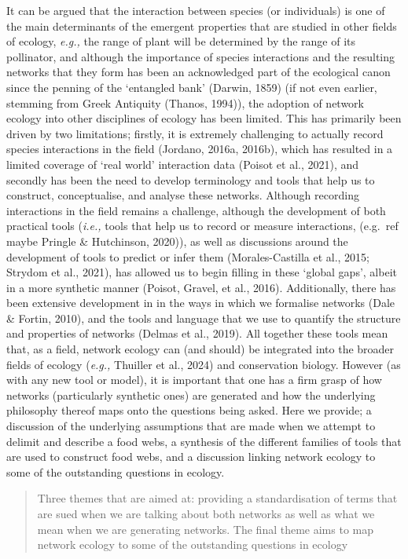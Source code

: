\documentclass[
]{article}
\begin{document}
It can be argued that the interaction between species (or individuals)
is one of the main determinants of the emergent properties that are
studied in other fields of ecology, \emph{e.g.,} the range of plant will
be determined by the range of its pollinator, and although the
importance of species interactions and the resulting networks that they
form has been an acknowledged part of the ecological canon since the
penning of the `entangled bank' (Darwin, 1859) (if not even earlier,
stemming from Greek Antiquity (Thanos, 1994)), the adoption of network
ecology into other disciplines of ecology has been limited. This has
primarily been driven by two limitations; firstly, it is extremely
challenging to actually record species interactions in the field
(Jordano, 2016a, 2016b), which has resulted in a limited coverage of
`real world' interaction data (Poisot et al., 2021), and secondly has
been the need to develop terminology and tools that help us to
construct, conceptualise, and analyse these networks. Although recording
interactions in the field remains a challenge, although the development
of both practical tools (\emph{i.e.,} tools that help us to record or
measure interactions, (e.g.~ref maybe Pringle \& Hutchinson, 2020)), as
well as discussions around the development of tools to predict or infer
them (Morales-Castilla et al., 2015; Strydom et al., 2021), has allowed
us to begin filling in these `global gaps', albeit in a more synthetic
manner (Poisot, Gravel, et al., 2016). Additionally, there has been
extensive development in in the ways in which we formalise networks
(Dale \& Fortin, 2010), and the tools and language that we use to
quantify the structure and properties of networks (Delmas et al., 2019).
All together these tools mean that, as a field, network ecology can (and
should) be integrated into the broader fields of ecology (\emph{e.g.,}
Thuiller et al., 2024) and conservation biology. However (as with any
new tool or model), it is important that one has a firm grasp of how
networks (particularly synthetic ones) are generated and how the
underlying philosophy thereof maps onto the questions being asked. Here
we provide; a discussion of the underlying assumptions that are made
when we attempt to delimit and describe a food webs, a synthesis of the
different families of tools that are used to construct food webs, and a
discussion linking network ecology to some of the outstanding questions
in ecology.

\begin{quote}
Three themes that are aimed at: providing a standardisation of terms
that are sued when we are talking about both networks as well as what we
mean when we are generating networks. The final theme aims to map
network ecology to some of the outstanding questions in ecology
\end{quote}
\end{document}

